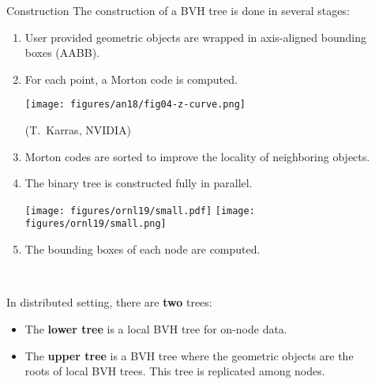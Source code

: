 \documentclass[final,hyperref={pdfpagelabels=false}]{beamer}
\begin{document}
\begin{frame}[t,fragile]
\begin{columns}[t]
\begin{column}{.450\textwidth}
\begin{block}{\centering Construction}
  The construction of a BVH tree is done in several stages:
  \begin{enumerate}
    \item User provided geometric objects are wrapped in axis-aligned bounding
      boxes (AABB).
    \item
      For each point, a Morton code is computed.

      \begin{center}
      \texttt{[image: figures/an18/fig04-z-curve.png]}

        {\small (T.~Karras, NVIDIA)}
      \end{center}
    \item
      Morton codes are sorted to improve the locality of neighboring objects.
    \item
      The binary tree is constructed fully in parallel.

      \begin{center}
      \texttt{[image: figures/ornl19/small.pdf]}
      \texttt{[image: figures/ornl19/small.png]}
      \end{center}
    \item The bounding boxes of each node are computed.
  \end{enumerate}

  \

  In distributed setting, there are \textbf{two} trees:
  \begin{itemize}
    \item
      The \textbf{lower tree} is a local BVH tree for on-node data.
    \item
      The \textbf{upper tree} is a BVH tree where the geometric objects are the
      roots of local BVH trees. This tree is replicated among nodes.
  \end{itemize}

\end{block}

\end{column} %

\begin{column}{.03\textwidth}\end{column}

\begin{column}{.480\textwidth}


\end{column}
\end{columns}
\end{frame}
\end{document}
